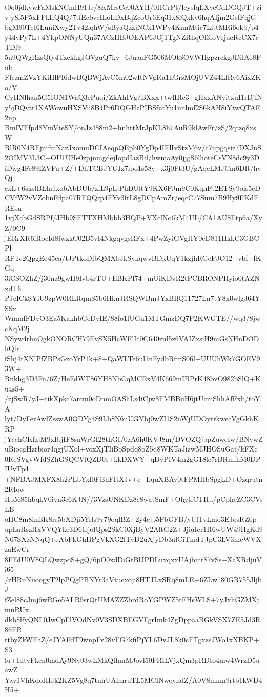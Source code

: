 t0q0jdkywFaMskNCmH91Jr/8KMrsCe00AYH/0HCrPt/lcysfqLXveCdDGQJT+ziv
y8f5P5xFFkIfQ4Q/7tfEcbvcILoLDxBqZcoUr6Eq31x8iQxkv6hqAIjm2GsfFqjG
bgM90TeI6LuniXwy2Tv42lqhW/sByaQzzjNCx1WPy4KnnMtic7LittMRi6okb/p4
y44vPy7L+4YkpONNyUQn37ACzHBJOEAP6JOj1TgNZRhqOl3foVcjucRcCX7cTDf9
5u9QWgRzsQty4TxekkgJOVguQ7kv+6JuaaFG506MOtSOVWHgpzrckgJDilAo8Fub
FfczmZVzYKiHlFI6dwBQBWjAvC5m02wItNVgRa1hGrsMOjUVZ44LlRy6AixZKo/Y
CyHNlhan5G5ION1WaQ3cPuqi/ZkAhIVg/BXxx+twlIRc3+gHxxANyitxuI1rDjfN
y5jDQvtr1XAWcwuHXSVu8B4Pr6DQGHzPIBSfntYu1nnlmf2S6kAH8iYtwQTAF2np
BmIVFfpd8YmVteSY/onJz488m2+hnhrtMrJpKL8h7AuR9klAwFr/zS/2qtzq8xsW
RlR0N4RFjmfmNazJxomuDCIAeqpQEpb0YgDp4IElIvStzM6v/c7upgqsiz7DXJnS
2OIMV3L3C+OU1UHe0zpjnmgdejIopdIazBd/hwmaAy0jjgS6lhoteCsVN8dc9y3D
iDwg4Fe89IZVFu+Z/+DhTCBJYGIx7ipo1s58y+x3j0Ft3U/gAqeLMJCm6DR/hvQj
exL+6skslBLln1xobAbDUb/zfL9pLjPhDUltY9KX6FJm9C0KqnFt2ETSy9ois5cD
CVfW2vVZobnFdpa07RFQQrp4FYv3frL8gDCpAmZr/eqcC77Sum7B9Hy9FKdEREsu
1vjXcbGdSRPf/JHb9SETTXHMbbb3HQP+VXclNo6kM4UL/CA1AU8Etp6a/XyZ/0C9
jERrXR6iRocId8fwzkC02B5vI4NkgqvgsRFx+4PwZyiGVgHY0eD811HkkC3GBCPl
RFTc2QpgEq45ea/tJPtkoDfbQMXbJkSykqwvBDkUqY1kzjhRGeFJO12+vbf+fKGq
3iCSOZhZ/j30nz9gwH9Ivb4rTU+EBKPf74+mUiKDvR2tPCBRONPHyio0tAZNxdT6
PJcICkSYiU9zpW0RLRqmS5b6HkuJRSQWBmJYxBIlQ11727Ln7tY8x0wlgJ64YSSx
WmmfFDvO3Ea5KakhbGeDyIE/88fo1fUGu1MTGmzDQ7P2KWGTE//wq3/8jwcKqM2j
NSyw4rhnOgkONORCH79EvSX5HcWFlIc0C640znl5z6VAIZxsiH9mGsNHnDODhQfr
fShj4tXNlPfZBPsGzoYrP1k+8+QaWLTe6ul1nFydbRfmS06l+UUUhWk7GOEV93W+
Rnkhg3D3Fn/6Z/HeFdWT86YH8NbCqMCExV4K669mIBPrK48bvO982bSlQ+Ku4s5+
/zjSwR/yJ+tikXpkc7arcm0oDnmOAShLs4iCjw8FMBBuH6jtUcmShhAfFxb/toYA
lyt/DyFerAwlZsswA0QDYg4S9Lb8N6nUGYbj0wZI1S2nWjUDOytrkwecVgGkhKRP
jYcehCKfzjM9xIbjIF8snWrGI28thGI/0zA6h0KVJ8m/DVOZQjbpZuweIw/BNvwZ
uBiocgHzrbior4qgjUXol+voxXjTIiBoSpdq8oZ5q8WKTaJizwMJHOSuGat/kFXc
0ReSVgvWfdSZhGSQCVlQZD0s+kkDXWY+qDyPIV4m2gG18lc7rBRmfhM0DPIUvTp4
+NFBAJMXFX8h2PLbYxl0FBhFItXJv+e+LquXBAy0tFPMHbSpgLD+Ozqrutn2RIow
HpM85hbqkV0iyn3c6KJN//3VzsUNKDz8c8watSmF+OhytfCTHu/pCpheZC3CVsLB
oHC8m8inBK8rr5bXDji5Yrls9v79oqlBZ+2y4ejp5FbGFB/yUlTvLmo3EJosRZ0p
upLaRszRxVVQYke3D6trjolQps2SkC0XjByV2AltG2Z+JjiuIer1R6wUW49HgKd9
N67SXzNNqQ+eAbFkGhHPgVkXG2lTyD2uXjyDb3alCiTmdTJpC3LV3mcWVXzaEwCr
8FFdU0V8QLQwzpoS+gQ/6pO0xdDiGtBlJPDLuxqxxUAjbmt87vSs+XcXRdjuVi65
/zHRuNuoogyT2lpPQgPBNYr3aVtuexoji8HTJLxSRq8mLE+6ZLw180GR755JljbJ
fZel88cJmj6wRGe5ALR5srQtUMAZZZbrdRoYGPWZ5rFHsWLS+7yJxhGZMXjmnRUx
dkb8lfyQNL0JwCpFlVOdNv9V3SDXBEGVFgrImk4ZgDppaaBGkVSX7ZE5Jd3R86ER
rtbyZkWEaZ/eJYAFdT9wnpFv28vFG7kfiPjYL6DvJL8k0cFTgxzsJWo1xXBKP+S3
lu+1dtyFken0mdAy9Nv03wLMkQfhmMJovl50FRILVjxQm3pRDIo4mw4WrzD5uawZ
Yav1VhKdoHIJk2KZ5Vg8q7tuhUAlmruTL5MCINwoyndZ/A0V8mmn9rtb1kWD4H5+
